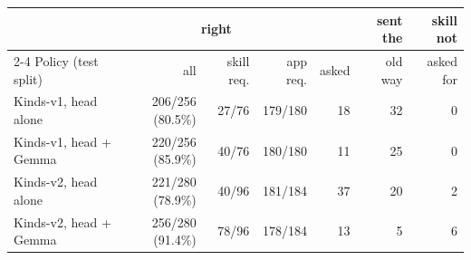 \begin{tabular}{lrrrrrr}
\toprule
 & \multicolumn{3}{c}{right} & & sent the & skill not \\
\cmidrule(lr){2-4}
Policy (test split) & all & skill req. & app req. & asked & old way & asked for \\
\midrule
Kinds-v1, head alone & 206/256 (80.5\%) & 27/76 & 179/180 & 18 & 32 & 0 \\
Kinds-v1, head + Gemma & 220/256 (85.9\%) & 40/76 & 180/180 & 11 & 25 & 0 \\
\midrule
Kinds-v2, head alone & 221/280 (78.9\%) & 40/96 & 181/184 & 37 & 20 & 2 \\
Kinds-v2, head + Gemma & 256/280 (91.4\%) & 78/96 & 178/184 & 13 & 5 & 6 \\
\bottomrule
\end{tabular}
